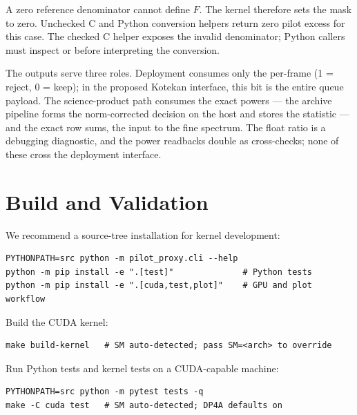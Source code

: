 \documentclass[10pt,letterpaper]{article}
\newcommand{\code}[1]{\texttt{\detokenize{#1}}}
\newcommand{\field}[1]{\texttt{\detokenize{#1}}}
\begin{document}
A zero reference denominator cannot define \(F\). The kernel therefore sets the mask to zero. Unchecked C and Python conversion helpers return zero pilot excess for this case. The checked C helper exposes the invalid denominator; Python callers must inspect \code{den} or \field{p_ref_sum_u64} before interpreting the conversion.

The outputs serve three roles. Deployment consumes only the per-frame
\code{mask} (1 = reject, 0 = keep); in the proposed Kotekan interface, this
bit is the entire queue payload. The science-product path consumes the exact
\code{uint64} powers --- the archive pipeline forms the norm-corrected
decision on the host and stores the statistic --- and the exact \code{int32}
row sums, the input to the fine spectrum. The float ratio is a debugging
diagnostic, and the power readbacks double as cross-checks; none of these
cross the deployment interface.

\section{Build and Validation}

We recommend a source-tree installation for kernel development:
\begin{lstlisting}[style=shell]
PYTHONPATH=src python -m pilot_proxy.cli --help
python -m pip install -e ".[test]"              # Python tests
python -m pip install -e ".[cuda,test,plot]"    # GPU and plot workflow
\end{lstlisting}
Build the CUDA kernel:
\begin{lstlisting}[style=shell]
make build-kernel   # SM auto-detected; pass SM=<arch> to override
\end{lstlisting}
Run Python tests and kernel tests on a CUDA-capable machine:
\begin{lstlisting}[style=shell]
PYTHONPATH=src python -m pytest tests -q
make -C cuda test   # SM auto-detected; DP4A defaults on
\end{lstlisting}
\end{document}
